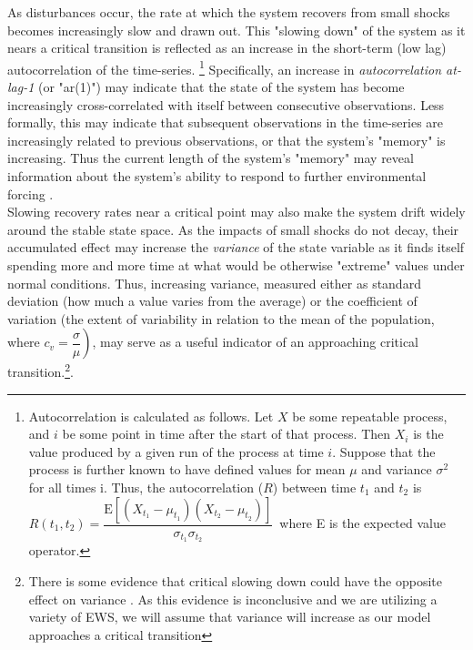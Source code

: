 \documentclass[12pt]{article}
\begin{document}
As disturbances occur, the rate at which the system recovers from small shocks becomes increasingly slow and drawn out. This "slowing down" of the system as it nears a critical transition is reflected as an increase in the short-term (low lag) autocorrelation of the time-series. \footnote{
	Autocorrelation is calculated as follows. Let $X$ be some repeatable process, and $i$ be some point in time after the start of that process. Then $X_i$ is the value  produced by a given run of the process at time $i$. Suppose that the process is further known to have defined values for mean $\mu$ and variance $\sigma^2$ for all times i. Thus, the autocorrelation ($R$) between time $t_1$ and $t_2$ is $R(t_1,t_2) = \dfrac{\text{E} [(X_{t_1} - \mu_{t_1})(X_{t_2} - \mu_{t_2})]}{\sigma_{t_1}\sigma_{t_2}}\,$ where E is the expected value operator.}
Specifically, an increase in \emph{autocorrelation at-lag-1} (or "ar(1)") may indicate that the state of the system has become increasingly cross-correlated with itself between consecutive observations. Less formally, this may indicate that subsequent observations in the time-series are increasingly related to previous observations, or that the system's "memory" is increasing. Thus the current length of the system's "memory" may reveal information about the system's ability to respond to further environmental forcing \cite{Dakos2012}. \\

Slowing recovery rates near a critical point may also make the system drift widely around the stable state space. As the impacts of small shocks do not decay, their accumulated effect may increase the \emph{variance} of the state variable \cite{Scheffer2009a} as it finds itself spending more and more time at what would be otherwise "extreme" values under normal conditions. Thus, increasing variance, measured either as standard deviation (how much a value varies from the average) or the coefficient of variation (the extent of variability in relation to the mean of the population, where $\left.c_v = \dfrac{\sigma}{\mu}\right)$, may serve as a useful indicator of an approaching critical transition.\footnote{There is some evidence that critical slowing down could have the opposite effect on variance \cite{Berglund2002}. As this evidence is inconclusive and we are utilizing a variety of EWS, we will assume that variance will increase as our model approaches a critical transition}. \\
\end{document}
